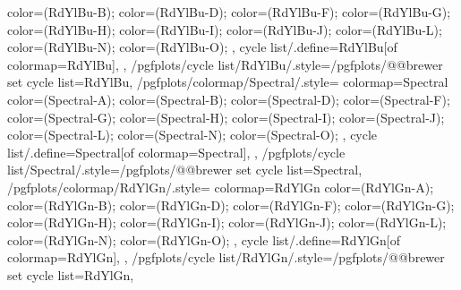 {{{      color=(RdYlBu-B);
      color=(RdYlBu-D);
      color=(RdYlBu-F);
      color=(RdYlBu-G);
      color=(RdYlBu-H);
      color=(RdYlBu-I);
      color=(RdYlBu-J);
      color=(RdYlBu-L);
      color=(RdYlBu-N);
      color=(RdYlBu-O);
    },
    cycle list/.define={RdYlBu}{[of colormap=RdYlBu]},
  },
  /pgfplots/cycle list/RdYlBu/.style={/pgfplots/@@brewer set cycle list={RdYlBu}},
  /pgfplots/colormap/Spectral/.style={
    colormap={Spectral}{
      color=(Spectral-A);
      color=(Spectral-B);
      color=(Spectral-D);
      color=(Spectral-F);
      color=(Spectral-G);
      color=(Spectral-H);
      color=(Spectral-I);
      color=(Spectral-J);
      color=(Spectral-L);
      color=(Spectral-N);
      color=(Spectral-O);
    },
    cycle list/.define={Spectral}{[of colormap=Spectral]},
  },
  /pgfplots/cycle list/Spectral/.style={/pgfplots/@@brewer set cycle list={Spectral}},
  /pgfplots/colormap/RdYlGn/.style={
    colormap={RdYlGn}{
      color=(RdYlGn-A);
      color=(RdYlGn-B);
      color=(RdYlGn-D);
      color=(RdYlGn-F);
      color=(RdYlGn-G);
      color=(RdYlGn-H);
      color=(RdYlGn-I);
      color=(RdYlGn-J);
      color=(RdYlGn-L);
      color=(RdYlGn-N);
      color=(RdYlGn-O);
    },
    cycle list/.define={RdYlGn}{[of colormap=RdYlGn]},
  },
  /pgfplots/cycle list/RdYlGn/.style={/pgfplots/@@brewer set cycle list={RdYlGn}},
}

